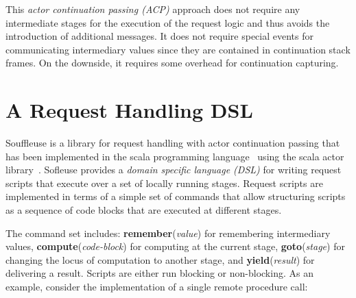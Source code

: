 \documentclass{sig-alternate}
\begin{document}
This \emph{actor continuation passing (ACP)} approach does not require any intermediate stages for
the execution of the request logic and thus avoids the introduction of additional messages. It does
not require special events for communicating intermediary values since they are contained in
continuation stack frames. On the downside, it requires some overhead for continuation capturing.



\section{A Request Handling DSL}

Souffleuse is a library for request handling with actor continuation passing that has been
implemented in the scala programming language~\cite{Odersky:2004} using the scala actor
library~\cite{Haller:2007}. Sofleuse provides a \emph{domain specific language (DSL)} for writing
request scripts that execute over a set of locally running stages. Request scripts are implemented
in terms of a simple set of commands that allow structuring scripts as a sequence of code blocks
that are executed at different stages.

The command set includes: \textbf{remember}(\emph{value}) for remembering intermediary values,
\textbf{compute}(\emph{code-block}) for computing at the current stage, \textbf{goto}(\emph{stage})
for changing the locus of computation to another stage, and \textbf{yield}(\emph{result}) for
delivering a result. Scripts are either run blocking or non-blocking. As an example, consider the
implementation of a single remote procedure call:

 \medskip
\end{document}
